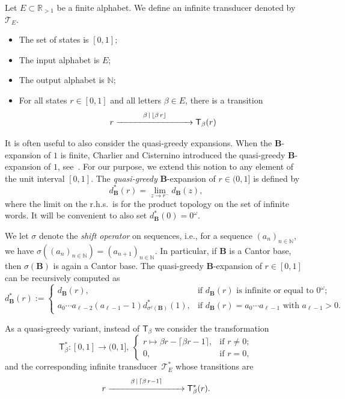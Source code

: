 \documentclass[12pt,reqno]{amsart}
\newcommand{\B}{{\mathbf{B}}}
\begin{document}
\begin{definition}
Let $E\subset\mathbb{R}_{>1}$ be a finite alphabet. 
We define an infinite transducer denoted by~$\mathcal{T}_E$. 
\begin{itemize}
\item The set of states is $[0,1]$; 
\item The input alphabet is $E$;
\item The output alphabet is $\mathbb{N}$;
\item For all states $r\in [0,1]$ and all letters $\beta \in E$, there is a transition
  \[
    r\stackrel{\beta \,|\, \lfloor \beta\, r\rfloor}{\xrightarrow{\hspace{3 cm}}} \mathsf{T}_{\beta}(r)
    \]
 \end{itemize}
\end{definition}

It is often useful to also consider the quasi-greedy expansions. When the $\B$-expansion of $1$ is finite, Charlier and Cisternino introduced the quasi-greedy $\B$-expansion of $1$, see~\cite{CC2021}. For our purpose, we extend this notion to any element of the unit interval $[0,1]$. The \emph{quasi-greedy} $\B$-expansion of $r\in (0,1]$ is defined by 
\[
    d_\B^*(r)=\lim_{z\to r^-} d_\B(z),
\]
where the limit on the r.h.s.\ is for the product topology on the set of infinite words. It will be convenient to also set $d_\B^*(0)=0^\omega$.

We let $\sigma$ denote the {\em shift operator} on sequences, i.e., for a sequence $(a_n)_{n\in\mathbb{N}}$, we have $\sigma((a_n)_{n\in\mathbb{N}})=(a_{n+1})_{n\in\mathbb{N}}$. In particular, if $\B$ is a Cantor base, then $\sigma(\B)$ is again a Cantor base. The quasi-greedy $\B$-expansion of $r\in[0,1]$ can be recursively computed as
 \[
    d_{\B}^*(r):=\begin{cases}
        d_{\B}(r), & \text{if $d_{\B}(r)$ is infinite or equal to $0^\omega$}; \\ 
        a_0 \cdots a_{\ell-2}(a_{\ell-1}-1)d_{\sigma^{\ell}(\B)}^*(1), &\text{if $d_{\B}(r)= a_0 \cdots a_{\ell-1}$ with $a_{\ell-1}>0$}.
    \end{cases}  
\] 

\begin{definition}
As a quasi-greedy variant, instead of $\mathsf{T}_\beta$ we consider the transformation 
\[
    \mathsf{T}_\beta^*\colon [0,1]\to (0,1],\ 
    \begin{cases}
        r\mapsto \beta r -\lceil \beta r-1\rceil, & \text{if } r\ne 0;\\
        0,   & \text{if } r=0,
    \end{cases}
\]
and the corresponding infinite transducer~$\mathcal{T}^*_E$ whose transitions are
\[r\stackrel{\beta \, |\, \lceil \beta\, r-1\rceil}{\xrightarrow{\hspace{3 cm}}} \mathsf{T}_{\beta}^*(r).\]  
\end{definition}
\end{document}
